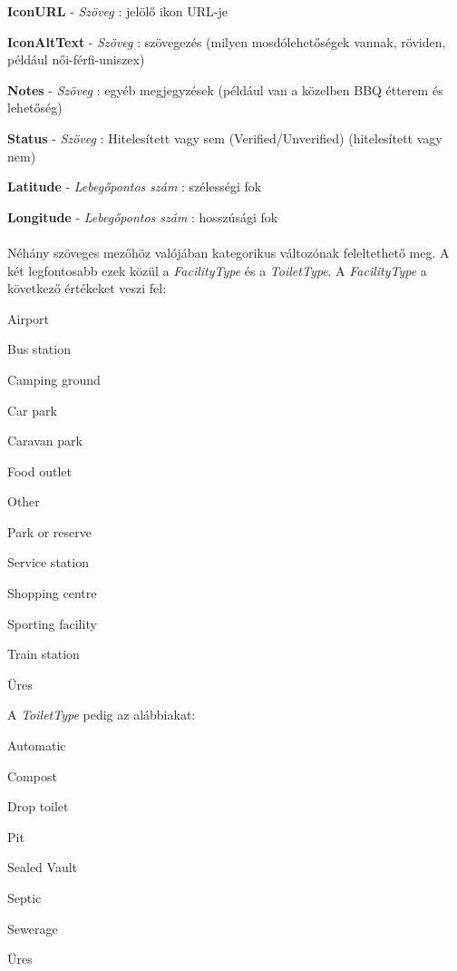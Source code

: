 \begin{compactlist}
		\item \textbf{IconURL} - \textit{Szöveg} : jelölő ikon URL-je
		\item \textbf{IconAltText} - \textit{Szöveg} : szövegezés (milyen mosdólehetőségek vannak, röviden, például női-férfi-uniszex)
		\item \textbf{Notes} - \textit{Szöveg} : egyéb megjegyzések (például van a közelben BBQ étterem és lehetőség)
		\item \textbf{Status} - \textit{Szöveg} : Hitelesített vagy sem (Verified/Unverified) (hitelesített vagy nem)
		\item \textbf{Latitude} - \textit{Lebegőpontos szám} : szélességi fok
		\item \textbf{Longitude} - \textit{Lebegőpontos szám} : hosszúsági fok
	\end{compactlist}
	\paragraph{}
	Néhány szöveges mezőhöz valójában kategorikus változónak feleltethető meg. A két legfontosabb ezek közül a \textit{FacilityType} és a \textit{ToiletType}. A \textit{FacilityType} a következő értékeket veszi fel:
	\begin{compactlist}
		\item Airport
		\item Bus station
		\item Camping ground
		\item Car park
		\item Caravan park
		\item Food outlet
		\item Other
		\item Park or reserve
		\item Service station
		\item Shopping centre
		\item Sporting facility
		\item Train station
		\item Üres
	\end{compactlist}
	A \textit{ToiletType} pedig az alábbiakat:
	\begin{compactlist}
		\item Automatic
		\item Compost
		\item Drop toilet
		\item Pit
		\item Sealed Vault
		\item Septic
		\item Sewerage
		\item Üres
	\end{compactlist}
	
